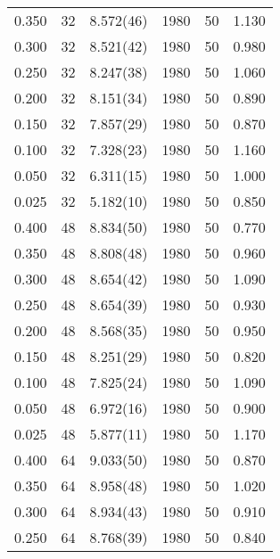 \begin{tabular}{rrlrrr}
 0.350 &      32 & 8.572(46)  &                1980 &                  50 &    1.130 \\
 0.300 &      32 & 8.521(42)  &                1980 &                  50 &    0.980 \\
 0.250 &      32 & 8.247(38)  &                1980 &                  50 &    1.060 \\
 0.200 &      32 & 8.151(34)  &                1980 &                  50 &    0.890 \\
 0.150 &      32 & 7.857(29)  &                1980 &                  50 &    0.870 \\
 0.100 &      32 & 7.328(23)  &                1980 &                  50 &    1.160 \\
 0.050 &      32 & 6.311(15)  &                1980 &                  50 &    1.000 \\
 0.025 &      32 & 5.182(10)  &                1980 &                  50 &    0.850 \\
 0.400 &      48 & 8.834(50)  &                1980 &                  50 &    0.770 \\
 0.350 &      48 & 8.808(48)  &                1980 &                  50 &    0.960 \\
 0.300 &      48 & 8.654(42)  &                1980 &                  50 &    1.090 \\
 0.250 &      48 & 8.654(39)  &                1980 &                  50 &    0.930 \\
 0.200 &      48 & 8.568(35)  &                1980 &                  50 &    0.950 \\
 0.150 &      48 & 8.251(29)  &                1980 &                  50 &    0.820 \\
 0.100 &      48 & 7.825(24)  &                1980 &                  50 &    1.090 \\
 0.050 &      48 & 6.972(16)  &                1980 &                  50 &    0.900 \\
 0.025 &      48 & 5.877(11)  &                1980 &                  50 &    1.170 \\
 0.400 &      64 & 9.033(50)  &                1980 &                  50 &    0.870 \\
 0.350 &      64 & 8.958(48)  &                1980 &                  50 &    1.020 \\
 0.300 &      64 & 8.934(43)  &                1980 &                  50 &    0.910 \\
 0.250 &      64 & 8.768(39)  &                1980 &                  50 &    0.840 \\

\end{tabular}

